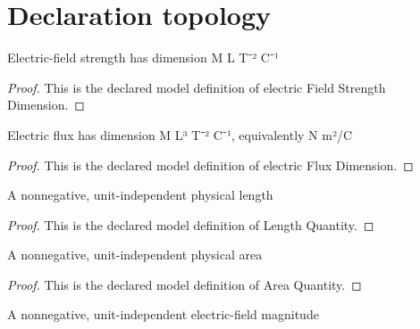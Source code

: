\section{Declaration topology}
\begin{definition}
  \label{def:physics:phyx-mini-0844:phyxminiproblems-problemphyxmini0844-electricfieldstrengthdimension}
  Electric-field strength has dimension M L T⁻² C⁻¹
\end{definition}
\begin{proof}
  This is the declared model definition of electric Field Strength Dimension.
\end{proof}
\begin{definition}
  \label{def:physics:phyx-mini-0844:phyxminiproblems-problemphyxmini0844-electricfluxdimension}
  Electric flux has dimension M L³ T⁻² C⁻¹, equivalently N m²/C
\end{definition}
\begin{proof}
  This is the declared model definition of electric Flux Dimension.
\end{proof}
\begin{definition}
  \label{def:physics:phyx-mini-0844:phyxminiproblems-problemphyxmini0844-lengthquantity}
  A nonnegative, unit-independent physical length
\end{definition}
\begin{proof}
  This is the declared model definition of Length Quantity.
\end{proof}
\begin{definition}
  \label{def:physics:phyx-mini-0844:phyxminiproblems-problemphyxmini0844-areaquantity}
  A nonnegative, unit-independent physical area
\end{definition}
\begin{proof}
  This is the declared model definition of Area Quantity.
\end{proof}
\begin{definition}
  \label{def:physics:phyx-mini-0844:phyxminiproblems-problemphyxmini0844-electricfieldstrengthquantity}
  A nonnegative, unit-independent electric-field magnitude
\end{definition}
